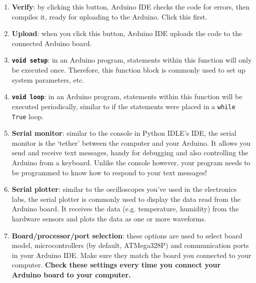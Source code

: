 \documentclass{article}
\begin{document}
\begin{enumerate}
    \item \textbf{Verify}: by clicking this button, Arduino IDE checks the code for errors, then compiles it, ready for uploading to the Arduino. Click this first.
    \item \textbf{Upload}:  when you click this button, Arduino IDE uploads the code to the connected Arduino board.
    \item \textbf{\texttt{void setup}}: in an Arduino program, statements within this function will only be executed once. Therefore, this function block is commonly used to set up system parameters, etc.
    \item \textbf{\texttt{void loop}}: in an Arduino program, statements within this function will be executed  periodically, similar to if the statements were placed in a \texttt{while True} loop. 
    \item \textbf{Serial monitor}: similar to the console in Python IDLE's IDE, the serial monitor is the `tether' between the computer and your Arduino. It allows you send and receive text messages, handy for debugging and also controlling the Arduino from a keyboard. Unlike the console however, your program needs to be programmed to know how to respond to your text messages!
    \item \textbf{Serial plotter}: similar to the oscilloscopes you've used in the electronics labs, the serial plotter is commonly used to display the data read from the Arduino board. It receives the data (e.g. temperature, humidity) from the hardware sensors and plots the data as one or more waveforms.  
    \item \textbf{Board/processor/port selection}: these options are used to select board model, microcontrollers (by default, ATMega328P) and communication ports in your Arduino IDE. Make sure they match the board you connected to your computer. \textbf{Check these settings every time you connect your Arduino board to your computer.}
\end{enumerate}
\end{document}
